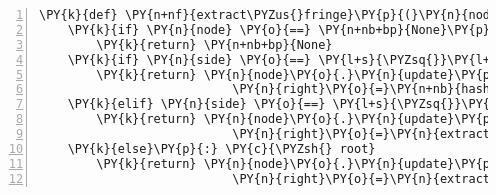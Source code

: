 \begin{Verbatim}[commandchars=\\\{\},numbers=left,firstnumber=1,stepnumber=1,codes={\catcode`\$=3\catcode`\^=7\catcode`\_=8}]
\PY{k}{def} \PY{n+nf}{extract\PYZus{}fringe}\PY{p}{(}\PY{n}{node}\PY{p}{,} \PY{n}{side}\PY{p}{)}\PY{p}{:}
    \PY{k}{if} \PY{n}{node} \PY{o}{==} \PY{n+nb+bp}{None}\PY{p}{:}
        \PY{k}{return} \PY{n+nb+bp}{None}
    \PY{k}{if} \PY{n}{side} \PY{o}{==} \PY{l+s}{\PYZsq{}}\PY{l+s}{left}\PY{l+s}{\PYZsq{}}\PY{p}{:}
        \PY{k}{return} \PY{n}{node}\PY{o}{.}\PY{n}{update}\PY{p}{(}\PY{n}{left}\PY{o}{=}\PY{n}{extract\PYZus{}fringe}\PY{p}{(}\PY{n}{node}\PY{o}{.}\PY{n}{left}\PY{p}{,} \PY{l+s}{\PYZsq{}}\PY{l+s}{left}\PY{l+s}{\PYZsq{}}\PY{p}{)}\PY{p}{,} 
                           \PY{n}{right}\PY{o}{=}\PY{n+nb}{hash}\PY{p}{(}\PY{n}{node}\PY{o}{.}\PY{n}{right}\PY{p}{)}\PY{p}{)}\PY{o}{.}
    \PY{k}{elif} \PY{n}{side} \PY{o}{==} \PY{l+s}{\PYZsq{}}\PY{l+s}{right}\PY{l+s}{\PYZsq{}}\PY{p}{:}
        \PY{k}{return} \PY{n}{node}\PY{o}{.}\PY{n}{update}\PY{p}{(}\PY{n}{left}\PY{o}{=}\PY{n+nb}{hash}\PY{p}{(}\PY{n}{node}\PY{o}{.}\PY{n}{left}\PY{p}{)}\PY{p}{,}
                           \PY{n}{right}\PY{o}{=}\PY{n}{extract\PYZus{}fringe}\PY{p}{(}\PY{n}{node}\PY{o}{.}\PY{n}{right}\PY{p}{,} \PY{l+s}{\PYZsq{}}\PY{l+s}{right}\PY{l+s}{\PYZsq{}}\PY{p}{)}\PY{p}{)}
    \PY{k}{else}\PY{p}{:} \PY{c}{\PYZsh{} root}
        \PY{k}{return} \PY{n}{node}\PY{o}{.}\PY{n}{update}\PY{p}{(}\PY{n}{left}\PY{o}{=}\PY{n}{extract\PYZus{}fringe}\PY{p}{(}\PY{n}{node}\PY{o}{.}\PY{n}{left}\PY{p}{,} \PY{l+s}{\PYZsq{}}\PY{l+s}{left}\PY{l+s}{\PYZsq{}}\PY{p}{)}\PY{p}{,}
                           \PY{n}{right}\PY{o}{=}\PY{n}{extract\PYZus{}fringe}\PY{p}{(}\PY{n}{node}\PY{o}{.}\PY{n}{right}\PY{p}{,} \PY{l+s}{\PYZsq{}}\PY{l+s}{right}\PY{l+s}{\PYZsq{}}\PY{p}{)}\PY{p}{)}
\end{Verbatim}
